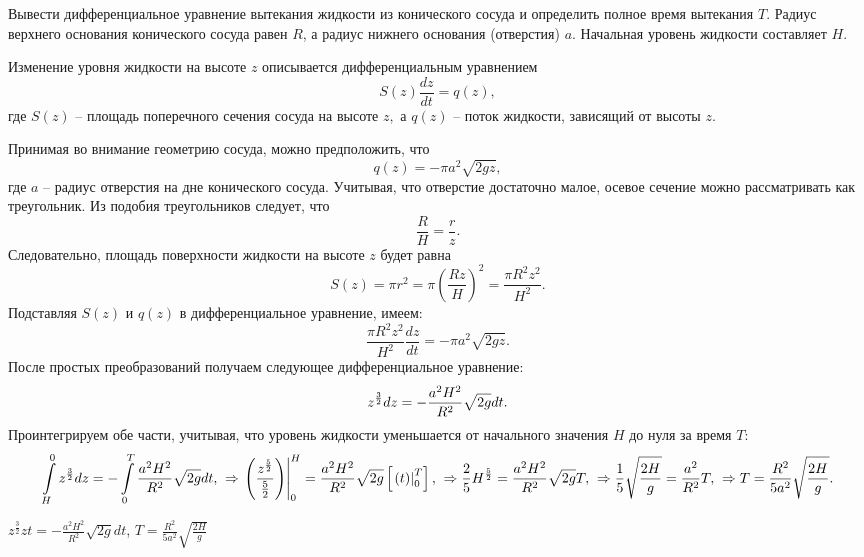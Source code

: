 \begin{ex}
Вывести дифференциальное уравнение вытекания жидкости из конического сосуда и определить полное время вытекания $T$. Радиус верхнего основания конического сосуда равен $R$, а радиус нижнего основания (отверстия) $a$. Начальная уровень жидкости составляет $H$.
\begin{sol}
Изменение уровня жидкости на высоте \(z\) описывается дифференциальным уравнением
\[S\left( z \right)\frac{{dz}}{{dt}} = q\left( z \right),\]
где \(S\left( z \right)\) -- площадь поперечного сечения сосуда на высоте \(z,\) а \(q\left( z \right)\) -- поток жидкости, зависящий от высоты $z$.

Принимая во внимание геометрию сосуда, можно предположить, что \[q\left( z \right) =  - \pi {a^2}\sqrt {2gz} ,\] где \(a\) -- радиус отверстия на дне конического сосуда. Учитывая, что отверстие достаточно малое, осевое сечение можно рассматривать как треугольник. Из подобия треугольников следует, что \[\frac{R}{H} = \frac{r}{z}.\] Следовательно, площадь поверхности жидкости на высоте \(z\) будет равна
\[
{S\left( z \right) = \pi {r^2} }
= {\pi {\left( {\frac{{Rz}}{H}} \right)^2} }
= {\frac{{\pi {R^2}{z^2}}}{{{H^2}}}.}
\]
Подставляя \(S\left( z \right)\) и \(q\left( z \right)\) в дифференциальное уравнение, имеем:
\[\frac{{\pi {R^2}{z^2}}}{{{H^2}}}\frac{{dz}}{{dt}} =  - \pi {a^2}\sqrt {2gz} .\]
После простых преобразований получаем следующее дифференциальное уравнение:
\[{z^{\large\frac{3}{2}\normalsize}}dz =  - \frac{{{a^2}{H^2}}}{{{R^2}}}\sqrt {2g} dt.\]
Проинтегрируем обе части, учитывая, что уровень жидкости уменьшается от начального значения \(H\) до нуля за время \(T:\)
\[
{\int\limits_H^0 {{z^{\large\frac{3}{2}\normalsize}}dz}  =  - \int\limits_0^T {\frac{{{a^2}{H^2}}}{{{R^2}}}\sqrt {2g} dt} ,}\;\; 
{\Rightarrow \left. {\left( {\frac{{{z^{\large\frac{5}{2}\normalsize}}}}{{\frac{5}{2}}}} \right)} \right|_0^H = \frac{{{a^2}{H^2}}}{{{R^2}}}\sqrt {2g} \left[ {\left. {\left( t \right)} \right|_0^T} \right],}\;\; 
{\Rightarrow \frac{2}{5}{H^{\large\frac{5}{2}\normalsize}} = \frac{{{a^2}{H^2}}}{{{R^2}}}\sqrt {2g} T,}\;\; 
{\Rightarrow \frac{1}{5}\sqrt {\frac{{2H}}{g}}  = \frac{{{a^2}}}{{{R^2}}}T,}\;\; 
{\Rightarrow T = \frac{{{R^2}}}{{5{a^2}}}\sqrt {\frac{{2H}}{g}} .}
\]
\end{sol}
\begin{ans}
$z^{\frac{3}{2}}zt = - \frac{a^2H^2}{R^2}\sqrt{2g}dt$, $T = \frac{R^2}{5a^2}\sqrt{\frac{2H}{g}}$
\end{ans}
\end{ex}

